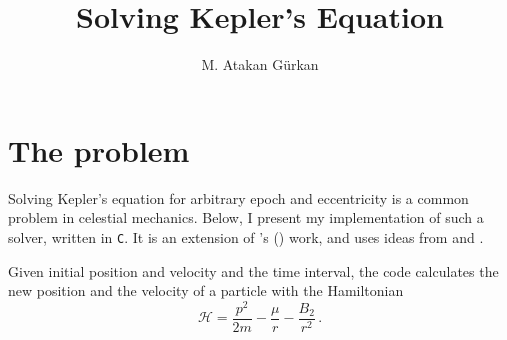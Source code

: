 \documentclass{article}
\author{M. Atakan Gürkan}
\title{Solving Kepler's Equation}
\date{}
\begin{document}
\maketitle
\section{The problem}
Solving Kepler's equation for arbitrary epoch and eccentricity
is a common problem in celestial mechanics. Below, I present
my implementation of such a solver, written in {\tt C}. It is
an extension of \citeauthor{1985CeMec..35..129S}'s (\citeyear{1985CeMec..35..129S}) work, and uses
ideas from \citet{1992fcm..book.....D} and \citet{1999CeMDA..74..275M}.

Given initial position and velocity and the time interval, the code
calculates the new position and the velocity of a particle with
the Hamiltonian
\begin{equation}
{\mathcal H} = \frac{p^2}{2m} - \frac{\mu}{r} -\frac{B_2}{r^2}\,.
\end{equation}
\end{document}
